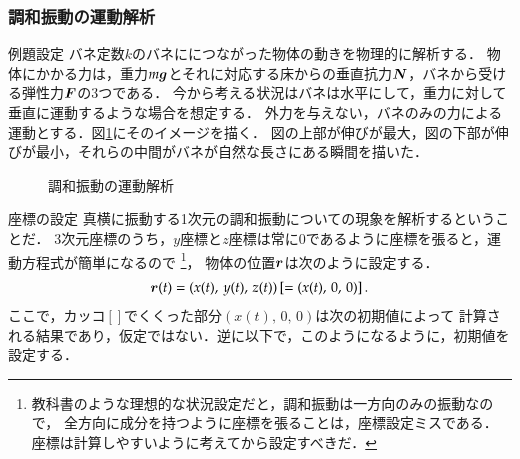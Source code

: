    \subsubsection{調和振動の運動解析}
    \begin{mysmallsec}{例題設定}
        バネ定数$k$のバネににつながった物体の動きを物理的に解析する．
        物体にかかる力は，重力$m\boldsymbol{g}$とそれに対応する床からの垂直抗力$\boldsymbol{N}$，バネから受ける弾性力$\boldsymbol{F}$の3つである．
        今から考える状況はバネは水平にして，重力に対して垂直に運動するような場合を想定する．
        外力を与えない，バネのみの力による運動とする．図\ref{fig:tanshindo_1}にそのイメージを描く．
        図の上部が伸びが最大，図の下部が伸びが最小，それらの中間がバネが自然な長さにある瞬間を描いた．
        \begin{figure}[hbt]
            \begin{center}
                \caption{調和振動の運動解析}
                \label{fig:tanshindo_1}
            \end{center}
        \end{figure}
    \end{mysmallsec}

    \begin{mysmallsec}{座標の設定}
        真横に振動する1次元の調和振動についての現象を解析するということだ．
        3次元座標のうち，$y$座標と$z$座標は常に0であるように座標を張ると，運動方程式が簡単になるので
            \footnote{
                教科書のような理想的な状況設定だと，調和振動は一方向のみの振動なので，
                全方向に成分を持つように座標を張ることは，座標設定ミスである．
                座標は計算しやすいように考えてから設定すべきだ．
            }，
        物体の位置$\boldsymbol{r}$は次のように設定する．
        \begin{align}
            \boldsymbol{r}(t) = (x(t), \, y(t), \, z(t)) \left[= (x(t),\,0,\,0)\right].
        \end{align}
        ここで，カッコ$\left[\right]$でくくった部分$(x(t),\,0,\,0)$は次の初期値によって
        計算される結果であり，仮定ではない．逆に以下で，このようになるように，初期値を設定する．
    \end{mysmallsec}

